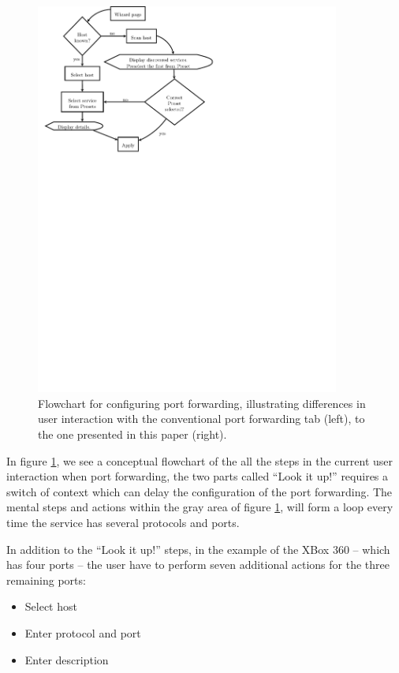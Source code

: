 \documentclass[a4paper,11pt,makeidx]{kth-bcs}
\begin{document}
\begin{figure}[h]
\begin{minipage}[b]{0.45\linewidth}
      \includegraphics[trim = 0mm 174mm 80mm 0mm, clip, width=10cm,natwidth=2.570in,natheight=0.580in]{after}
   \end{minipage}
   \caption{Flowchart for configuring port forwarding, illustrating differences in user interaction with the conventional port forwarding tab (left), to the one presented in this paper (right).}
   \label{fig:usability}
\end{figure}

In figure \ref{fig:usability}, we see a conceptual flowchart of the all the steps in the current user interaction when port forwarding, the two parts called ``Look it up!'' requires a switch of context which can delay the configuration of the port forwarding.
The mental steps and actions within the gray area of figure \ref{fig:usability}, will form a loop every time the service has several protocols and ports.

In addition to the ``Look it up!'' steps, in the example of the XBox 360 -- which has four ports -- the user have to perform seven additional actions for the three remaining ports:
\begin{itemize}
   \item Select host
   \item Enter protocol and port
   \item Enter description
\end{itemize}
\end{document}
